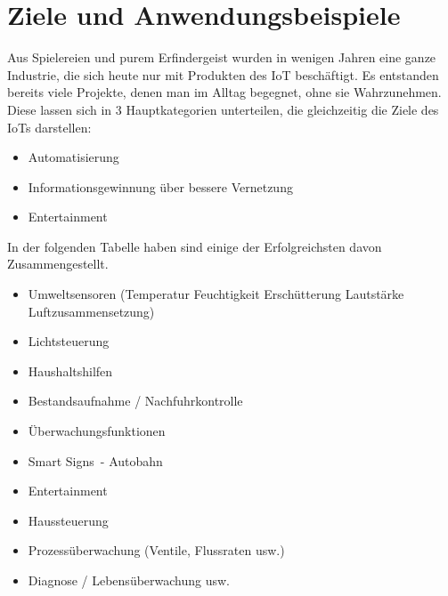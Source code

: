 \section{Ziele und Anwendungsbeispiele}\label{s:IoTZiele}

Aus Spielereien und purem Erfindergeist wurden in wenigen Jahren eine ganze Industrie, die sich heute nur mit Produkten des \ac{IoT} beschäftigt. Es entstanden bereits viele Projekte, denen man im Alltag begegnet, ohne sie Wahrzunehmen. 
Diese lassen sich in 3 Hauptkategorien unterteilen, die gleichzeitig die Ziele des \ac{IoT}s darstellen:

\begin{itemize}
	\item Automatisierung
	\item Informationsgewinnung über bessere Vernetzung
	\item Entertainment
\end{itemize}

In der folgenden Tabelle haben sind einige der Erfolgreichsten davon Zusammengestellt.

\begin{itemize} 
\item Umweltsensoren (Temperatur Feuchtigkeit Erschütterung Lautstärke Luftzusammensetzung) 
\item Lichtsteuerung
\item Haushaltshilfen
\item Bestandsaufnahme / Nachfuhrkontrolle
\item Überwachungsfunktionen
\item \glqq Smart Signs\grqq\ - Autobahn
\item Entertainment
\item Haussteuerung
\item Prozessüberwachung (Ventile, Flussraten usw.)
\item Diagnose / Lebensüberwachung usw.
\end{itemize}